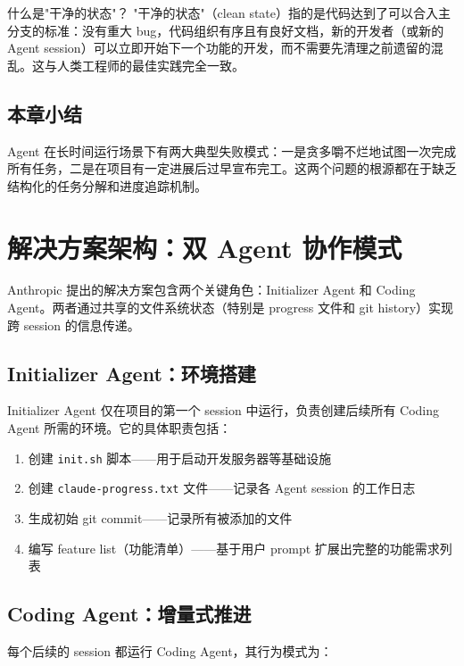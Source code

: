 \documentclass[a4paper]{article}
\begin{document}
\begin{importantbox}{什么是"干净的状态"？}
"干净的状态"（clean state）指的是代码达到了可以合入主分支的标准：没有重大 bug，代码组织有序且有良好文档，新的开发者（或新的 Agent session）可以立即开始下一个功能的开发，而不需要先清理之前遗留的混乱。这与人类工程师的最佳实践完全一致。
\end{importantbox}

\subsection{本章小结}

Agent 在长时间运行场景下有两大典型失败模式：一是贪多嚼不烂地试图一次完成所有任务，二是在项目有一定进展后过早宣布完工。这两个问题的根源都在于缺乏结构化的任务分解和进度追踪机制。


\section{解决方案架构：双 Agent 协作模式}

Anthropic 提出的解决方案包含两个关键角色：Initializer Agent 和 Coding Agent。两者通过共享的文件系统状态（特别是 progress 文件和 git history）实现跨 session 的信息传递。

\subsection{Initializer Agent：环境搭建}

Initializer Agent 仅在项目的第一个 session 中运行，负责创建后续所有 Coding Agent 所需的环境。它的具体职责包括：

\begin{enumerate}
    \item 创建 \texttt{init.sh} 脚本——用于启动开发服务器等基础设施
    \item 创建 \texttt{claude-progress.txt} 文件——记录各 Agent session 的工作日志
    \item 生成初始 git commit——记录所有被添加的文件
    \item 编写 feature list（功能清单）——基于用户 prompt 扩展出完整的功能需求列表
\end{enumerate}

\subsection{Coding Agent：增量式推进}

每个后续的 session 都运行 Coding Agent，其行为模式为：
\end{document}
